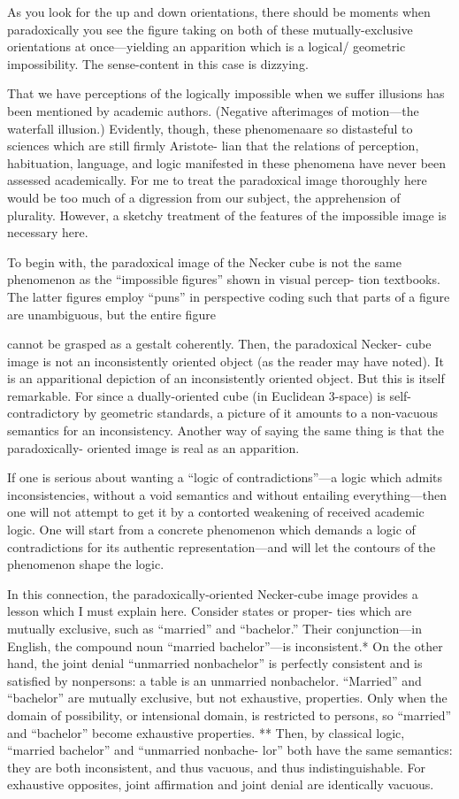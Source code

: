 As you look for the up and down orientations, there should be 
moments when paradoxically you see the figure taking on both of these 
mutually-exclusive orientations at once—yielding an apparition which 
is a logical/ geometric impossibility. The sense-content in this case is 
dizzying. 

That we have perceptions of the logically impossible when we 
suffer illusions has been mentioned by academic authors. (Negative 
afterimages of motion—the waterfall illusion.) Evidently, though, these 
phenomenaare so distasteful to sciences which are still firmly Aristote- 
lian that the relations of perception, habituation, language, and logic 
manifested in these phenomena have never been assessed academically. 
For me to treat the paradoxical image thoroughly here would be too 
much of a digression from our subject, the apprehension of plurality. 
However, a sketchy treatment of the features of the impossible image is 
necessary here. 

To begin with, the paradoxical image of the Necker cube is not the 
same phenomenon as the “impossible figures” shown in visual percep- 
tion textbooks. The latter figures employ “puns” in perspective coding 
such that parts of a figure are unambiguous, but the entire figure 


cannot be grasped as a gestalt coherently. Then, the paradoxical Necker- 
cube image is not an inconsistently oriented object (as the reader may 
have noted). It is an apparitional depiction of an inconsistently oriented 
object. But this is itself remarkable. For since a dually-oriented cube (in 
Euclidean 3-space) is self-contradictory by geometric standards, a 
picture of it amounts to a non-vacuous semantics for an inconsistency. 
Another way of saying the same thing is that the paradoxically- 
oriented image is real as an apparition. 

If one is serious about wanting a “logic of contradictions”—a logic 
which admits inconsistencies, without a void semantics and without 
entailing everything—then one will not attempt to get it by a contorted 
weakening of received academic logic. One will start from a concrete 
phenomenon which demands a logic of contradictions for its authentic 
representation—and will let the contours of the phenomenon shape the 
logic. 

In this connection, the paradoxically-oriented Necker-cube image 
provides a lesson which I must explain here. Consider states or proper- 
ties which are mutually exclusive, such as “married” and “bachelor.” 
Their conjunction—in English, the compound noun “married 
bachelor”—is inconsistent.* On the other hand, the joint denial 
“unmarried nonbachelor” is perfectly consistent and is satisfied by 
nonpersons: a table is an unmarried nonbachelor. “Married” and 
“bachelor” are mutually exclusive, but not exhaustive, properties. Only 
when the domain of possibility, or intensional domain, is restricted to 
persons, so “married” and “bachelor” become exhaustive properties. ** 
Then, by classical logic, “married bachelor” and “unmarried nonbache- 
lor” both have the same semantics: they are both inconsistent, and thus 
vacuous, and thus indistinguishable. For exhaustive opposites, joint 
affirmation and joint denial are identically vacuous. 

